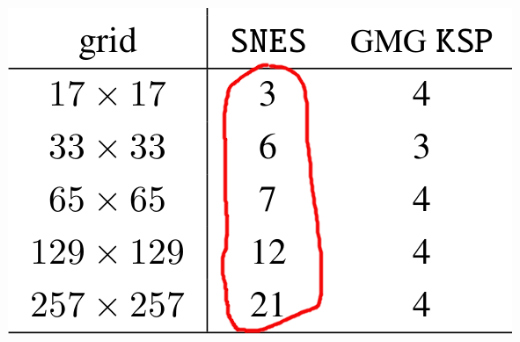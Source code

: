 \documentclass[svgnames,
               hyperref={colorlinks,citecolor=DeepPink4,linkcolor=FireBrick,urlcolor=Maroon},
               usepdftitle=false]  %
               {beamer}
\begin{document}
\begin{frame}[fragile]
\vspace{-20mm}
\hfill \includegraphics[height=0.25\textheight]{../talk-oxford/images/vi-newton-gmg-bad.png}
\end{frame}
\end{document}
